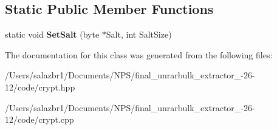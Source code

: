\subsection*{Static Public Member Functions}
\begin{DoxyCompactItemize}
\item 
\hypertarget{class_crypt_data_a8ec5054ba51bf5d94d81a92dd2213134}{static void {\bfseries Set\-Salt} (byte $\ast$Salt, int Salt\-Size)}\label{class_crypt_data_a8ec5054ba51bf5d94d81a92dd2213134}

\end{DoxyCompactItemize}


The documentation for this class was generated from the following files\-:\begin{DoxyCompactItemize}
\item 
/\-Users/salazbr1/\-Documents/\-N\-P\-S/final\-\_\-unrarbulk\-\_\-extractor\-\_-\/26-\/12/code/crypt.\-hpp\item 
/\-Users/salazbr1/\-Documents/\-N\-P\-S/final\-\_\-unrarbulk\-\_\-extractor\-\_-\/26-\/12/code/crypt.\-cpp\end{DoxyCompactItemize}
